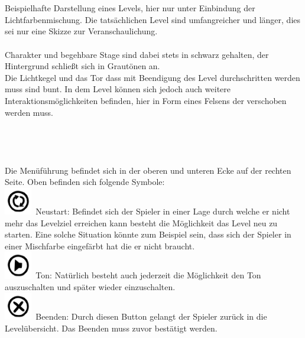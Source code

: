 \documentclass[10pt,a4paper,notitlepage]{report}
\begin{document}
	\\\\
	\Text
	Beispielhafte Darstellung eines Levels, hier nur unter Einbindung der Lichtfarbenmischung. Die tatsächlichen Level sind umfangreicher und länger,
	dies sei nur eine Skizze zur Veranschaulichung.\\\\
	Charakter und begehbare Stage sind dabei stets in schwarz gehalten, der Hintergrund schließt sich in Grautönen an.\\
	Die Lichtkegel und das Tor dass mit Beendigung des Level durchschritten werden muss sind bunt. In dem Level können sich jedoch auch weitere
	Interaktionsmöglichkeiten befinden, hier in Form eines Felsens der verschoben werden muss.
	\\\\
\clearpage\
\\
	\\
	\\
	\Text
		Die Menüführung befindet sich in der oberen und unteren Ecke auf der rechten Seite. Oben befinden sich folgende Symbole:
	\\
	\includegraphics[width=0.09\textwidth]{png/renew.png}\ 
	 Neustart: Befindet sich der Spieler in einer Lage durch welche er nicht mehr das Levelziel erreichen 			kann besteht die Möglichkeit das Level neu zu 			starten. Eine solche Situation könnte zum Beispiel sein, dass sich der Spieler in einer Mischfarbe eingefärbt hat die er 		nicht braucht.\
	\\
	\includegraphics[width=0.09\textwidth]{png/sound.png}\ 
	 Ton: Natürlich besteht auch jederzeit die Möglichkeit den Ton auszuschalten und später wieder einzuschalten.\
	\\
	\includegraphics[width=0.09\textwidth]{png/quit.png}\ 
	 Beenden: Durch diesen Button gelangt der Spieler zurück in die Levelübersicht. Das Beenden muss zuvor bestätigt werden. \
	\\\\
\end{document}
